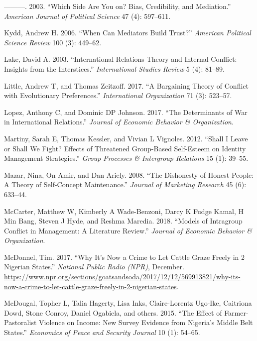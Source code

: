 \documentclass[11pt]{article}
\begin{document}
\leavevmode\hypertarget{ref-kydd2003side}{}%
---------. 2003. ``Which Side Are You on? Bias, Credibility, and
Mediation.'' \emph{American Journal of Political Science} 47 (4):
597--611.

\leavevmode\hypertarget{ref-kydd2006can}{}%
Kydd, Andrew H. 2006. ``When Can Mediators Build Trust?'' \emph{American
Political Science Review} 100 (3): 449--62.

\leavevmode\hypertarget{ref-lake2003international}{}%
Lake, David A. 2003. ``International Relations Theory and Internal
Conflict: Insights from the Interstices.'' \emph{International Studies
Review} 5 (4): 81--89.

\leavevmode\hypertarget{ref-little2017bargaining}{}%
Little, Andrew T, and Thomas Zeitzoff. 2017. ``A Bargaining Theory of
Conflict with Evolutionary Preferences.'' \emph{International
Organization} 71 (3): 523--57.

\leavevmode\hypertarget{ref-lopez2017determinants}{}%
Lopez, Anthony C, and Dominic DP Johnson. 2017. ``The Determinants of
War in International Relations.'' \emph{Journal of Economic Behavior \&
Organization}.

\leavevmode\hypertarget{ref-martiny2012shall}{}%
Martiny, Sarah E, Thomas Kessler, and Vivian L Vignoles. 2012. ``Shall I
Leave or Shall We Fight? Effects of Threatened Group-Based Self-Esteem
on Identity Management Strategies.'' \emph{Group Processes \& Intergroup
Relations} 15 (1): 39--55.

\leavevmode\hypertarget{ref-mazar2008dishonesty}{}%
Mazar, Nina, On Amir, and Dan Ariely. 2008. ``The Dishonesty of Honest
People: A Theory of Self-Concept Maintenance.'' \emph{Journal of
Marketing Research} 45 (6): 633--44.

\leavevmode\hypertarget{ref-mccarter2018models}{}%
McCarter, Matthew W, Kimberly A Wade-Benzoni, Darcy K Fudge Kamal, H Min
Bang, Steven J Hyde, and Reshma Maredia. 2018. ``Models of Intragroup
Conflict in Management: A Literature Review.'' \emph{Journal of Economic
Behavior \& Organization}.

\leavevmode\hypertarget{ref-mcdonnel2017graze}{}%
McDonnel, Tim. 2017. ``Why It's Now a Crime to Let Cattle Graze Freely
in 2 Nigerian States.'' \emph{National Public Radio (NPR)}, December.
\url{https://www.npr.org/sections/goatsandsoda/2017/12/12/569913821/why-its-now-a-crime-to-let-cattle-graze-freely-in-2-nigerian-states}.

\leavevmode\hypertarget{ref-mcdougal2015effect}{}%
McDougal, Topher L, Talia Hagerty, Lisa Inks, Claire-Lorentz Ugo-Ike,
Caitriona Dowd, Stone Conroy, Daniel Ogabiela, and others. 2015. ``The
Effect of Farmer-Pastoralist Violence on Income: New Survey Evidence
from Nigeria's Middle Belt States.'' \emph{Economics of Peace and
Security Journal} 10 (1): 54--65.
\end{document}
